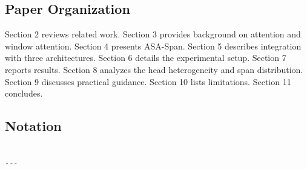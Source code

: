 \subsection{Paper Organization}

Section 2 reviews related work. Section 3 provides background on attention and 
window attention. Section 4 presents ASA-Span. Section 5 describes integration 
with three architectures. Section 6 details the experimental setup. Section 
7 reports results. Section 8 analyzes the head heterogeneity and span 
distribution. Section 9 discusses practical guidance. Section 10 lists 
limitations. Section 11 concludes.



\subsection{Notation}

\begin{lstlisting}

---
\end{lstlisting}